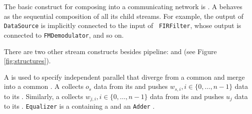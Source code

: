 


The basic construct for composing {\filters} into a communicating
network is {\pipeline}.  A {\pipeline} behaves as the sequential
composition of all its child streams.  For example, the output of
{\tt DataSource} is implicitly connected to the input of {\tt
FIRFilter}, whose output is connected to {\tt FMDemodulator}, and
so on.

There are two other stream constructs besides pipeline:
{\splitjoin} and {\feedbackloop} (see Figure
\ref{fig:structures}).

A {\splitjoin} is used to specify independent parallel {\streams}
that diverge from a common {\splitter} and merge into a common
{\joiner}. A {\splitter} collects $o_s$ data from its {\Input}
{\Channel} and pushes $w_{s,i}, i \in \{0,\dots,n-1\}$ data to its
{\Output} {\Channels}. Similarly, a {\joiner} collects $w_{j,i}, i
\in \{0,\dots,n-1\}$ data from its {\Input} {\Channel} and pushes
$u_j$ data to its {\Output} {\Channel}. {\tt Equalizer} is a
{\pipeline} containing a {\splitjoin} and an {\tt Adder} {\filter}.

\begin{comment}
There are two kinds of {\splitters}: 1) {\duplicate}, which replicates
each data item and sends a copy to each parallel \stream, and 2)
{\roundrobin}$(w_0, \dots, w_{n-1})$, which sends the first $w_0$
items to the first \stream, the next $w_1$ items to the second
\stream, and so on.  {\roundrobin} is also the only type of {\joiner}
that we support; its function is analogous to a {\roundrobin}
{\splitter}.  If a {\roundrobin} is written without any weights, we
assume that all $w_i = 1$. The {\splitter} and {\joiner} type are
specified with the keywords {\tt split} and {\tt join},
respectively (see Figure \ref{fig:radiocode}); the parallel
streams are specified by successive calls to {\tt add}, with the
$i$'th call setting the $i$'th stream in the splitjoin.
\end{comment}

